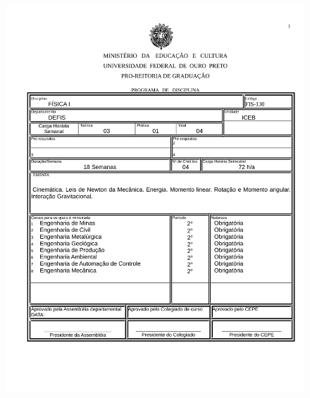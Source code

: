 \begin{figure}[p]
	\centering 
	\includegraphics[scale=0.7]{capitulos/anexo1-programas-disciplina/p24.pdf}
\end{figure}

